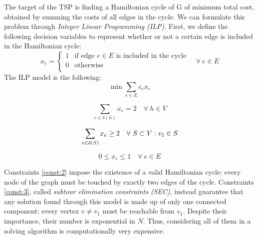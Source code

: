 \documentclass[12pt]{article}
\begin{document}
The target of the TSP is finding a Hamiltonian cycle of G of minimum total cost, obtained by summing the costs of all edges in the cycle. 
We can formulate this problem through \textit{Integer Linear Programming (ILP)}. First, we define the following decision variables to represent whether or not a certain edge is included in the Hamiltonian cycle:
$$x_e = \begin{cases}
  1 & \mbox{if edge } e\in E \mbox{ is included in the cycle} \\
  0 & \mbox{otherwise} \\
\end{cases} \quad \forall \ e\in E$$
The ILP model is the following: 
\begin{equation} \label{const:1}
  \min\sum_{e\in E}c_ex_e
\end{equation}

\begin{equation} \label{const:2}
  \sum_{e\in\delta(h)} x_e = 2 \quad \forall \ h\in V
\end{equation}

\begin{equation} \label{const:3}
  \sum_{e\in\delta(S)} x_e\geq 2 \quad \forall \ S\subset V : v_1 \in S \\
\end{equation}

\begin{equation} \label{const:4}
  0\leq x_e\leq1 \quad \forall \ e\in E
\end{equation}

Constraints \ref{const:2} impose the existence of a valid Hamiltonian cycle: every node of the graph must be touched by exactly two edges of the cycle.
Constraints \ref{const:3}, called \textit{subtour elimination constraints (SEC)}, instead guarantee that any solution found through this model is made up of only one connected component: every vertex $v\neq v_1$ must be reachable from $v_1$.
Despite their importance, their number is exponential in $N$. Thus, considering all of them in a solving algorithm is computationally very expensive.
\end{document}
